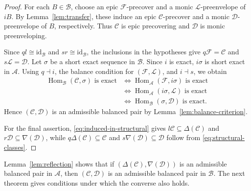 \documentclass[11pt]{amsart}
\theoremstyle{definition}
\theoremstyle{remark}
\theoremstyle{plain}
\numberwithin{equation}{section}
\begin{document}
\begin{proof}
	For each $B\in\mathcal{B}$, choose an epic
	$\mathcal{F}$-precover and a monic $\mathcal{L}$-preenvelope of $iB$. By Lemma~\ref{lem:transfer}, these induce an epic
	$\mathcal{C}$-precover and a monic $\mathcal{D}$-preenvelope of $B$, respectively. Thus $\mathcal{C}$ is epic precovering and $\mathcal{D}$ is monic preenveloping.
	
	Since $ql\cong\mathrm{id}_{\mathcal{B}}$ and
	$sr\cong\mathrm{id}_{\mathcal{B}}$, the inclusions in the hypotheses give $q\mathcal{F}=\mathcal{C}$ and
	$s\mathcal{L}=\mathcal{D}$. Let $\sigma$ be a short exact sequence in $\mathcal{B}$.
	Since $i$ is exact, $i\sigma$ is short exact in $\mathcal{A}$. Using $q\dashv i$, the balance condition for
	$(\mathcal{F},\mathcal{L})$, and $i\dashv s$, we obtain
	\[
	\begin{aligned}
		\operatorname{Hom}_{\mathcal{B}}(\mathcal{C},\sigma)
		\text{ is exact}
		&\Longleftrightarrow
		\operatorname{Hom}_{\mathcal{A}}(\mathcal{F},i\sigma)
		\text{ is exact}\\
		&\Longleftrightarrow
		\operatorname{Hom}_{\mathcal{A}}(i\sigma,\mathcal{L})
		\text{ is exact}\\
		&\Longleftrightarrow
		\operatorname{Hom}_{\mathcal{B}}(\sigma,\mathcal{D})
		\text{ is exact}.
	\end{aligned}
	\]
	Hence $(\mathcal{C},\mathcal{D})$ is an admissible balanced pair by Lemma~\ref{lem:balance-criterion}.
	
	For the final assertion, \eqref{eq:induced-in-structural} gives $l\mathcal{C}\subseteq\Delta(\mathcal{C})$ and
	$r\mathcal{D}\subseteq\nabla(\mathcal{D})$, while
	$q\Delta(\mathcal{C})\subseteq\mathcal{C}$ and
	$s\nabla(\mathcal{D})\subseteq\mathcal{D}$ follow from \eqref{eq:structural-classes}.
\end{proof}

Lemma~\ref{lem:reflection} shows that if
$(\Delta(\mathcal{C}),\nabla(\mathcal{D}))$ is an admissible balanced
pair in $\mathcal{A}$, then $(\mathcal{C},\mathcal{D})$ is an
admissible balanced pair in $\mathcal{B}$. The next theorem gives
conditions under which the converse also holds.
\end{document}
